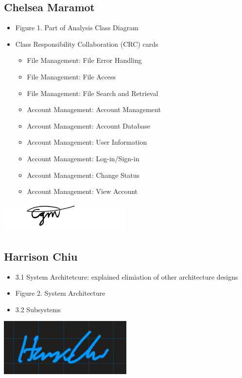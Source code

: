 \documentclass[]{article}
\begin{document}
\subsection{Chelsea Maramot}
\label{subsec:chelsea_maramot}
\begin{itemize}
	\item Figure 1. Part of Analysis Class Diagram
	\item Class Responsibility Collaboration (CRC) cards
 		\begin{itemize}
   			\item File Management: File Error Handling
      			\item File Management: File Access
	 		\item File Management: File Search and Retrieval
    			\item Account Management: Account Management
       			\item Account Management: Account Database
	  		\item Account Management: User Information
     			\item Account Management: Log-in/Sign-in
			\item Account Management: Change Status
   			\item Account Management: View Account
      		\end{itemize}
\end{itemize}
\includegraphics[width=0.5\textwidth]{chelsea.png}

\subsection{Harrison Chiu}
\label{subsec:harrison_chiu}
\begin{itemize}
	\item 3.1 System Architetcure: explained elimiation of other architecture designs
	\item Figure 2. System Architecture
 	\item 3.2 Subsystems
\end{itemize}
\includegraphics[width=0.5\textwidth]{harrison.png}
\end{document}
